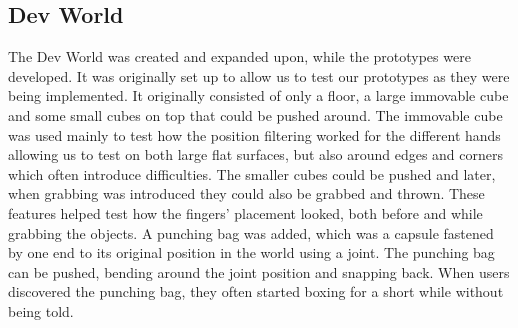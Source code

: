 \begin{table}[h]
\centering
\caption{Test procedure for the user evaluations.}
\label{tab:testProcedure}
\end{table}

\subsection{Dev World}
\label{subsec:devWorld}
The Dev World was created and expanded upon, while the prototypes were developed. It was originally set up to allow us to test our prototypes as they were being implemented. It originally consisted of only a floor, a large immovable cube and some small cubes on top that could be pushed around. The immovable cube was used mainly to test how the position filtering worked for the different hands allowing us to test on both large flat surfaces, but also around edges and corners which often introduce difficulties. The smaller cubes could be pushed and later, when grabbing was introduced they could also be grabbed and thrown. These features helped test how the fingers' placement looked, both before and while grabbing the objects. A punching bag was added, which was a capsule fastened by one end to its original position in the world using a joint. The punching bag can be pushed, bending around the joint position and snapping back. When users discovered the punching bag, they often started boxing for a short while without being told.

